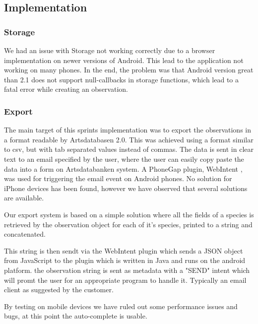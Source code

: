 \subsection{Implementation}

\subsubsection{Storage}

\label{sprint3:storage}

We had an issue with Storage not working correctly due to a browser
implementation on newer versions of Android. This lead to the application
not working on many  phones. In the end, the problem was that Android
version great than 2.1 does not support null-callbacks in storage functions, which
lead to a fatal error while creating an observation. 

	\subsubsection{Export}

	The main target of this sprints implementation was to export the
	observations in a format readable by Artsdatabasen 2.0. This was achieved
	using a format similar to csv, but with tab separated values instead of
	commas. The data is sent in clear text to an email specified by the user,
	where the user can easily copy paste the data into a form on Artsdatabanken
	system. A PhoneGap plugin, WebIntent \cite{library:webintent}, was used for triggering the email
	event on Android phones. No solution for iPhone devices has been found,
	however we have observed that several solutions are available.
	
	Our export system is based on a simple solution where all the fields of a species
	is retrieved by the observation object for each of it's species, printed to a string
	and concatenated.
	
	This string is then sendt via the WebIntent plugin which sends a JSON object from
	JavaScript to the plugin which is written in Java and runs on the android platform.
	the observation string is sent as metadata with a "SEND" intent which will promt 
	the user for an appropriate program to handle it. Typically an email client as
	suggested by the customer.

\label{Auto-complete}

By testing on mobile devices we have ruled out some performance issues and bugs,
at this point the auto-complete is usable.

